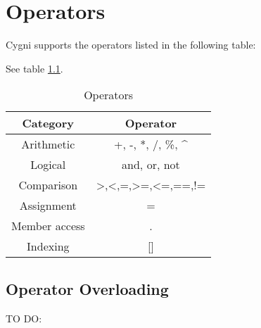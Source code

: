 \chapter{Operators}
Cygni supports the operators listed in the following table:

See table \ref{operators}.
\begin{table}
	\centering
	\begin{tabular}{|c|c|}
		\hline
		Category & Operator \\ 
		\hline
		Arithmetic & +, -, *, /, \%, \^ \\
		\hline
		Logical & and, or, not \\
		\hline
		Comparison & >,<,=,>=,<=,==,!= \\
		\hline
		Assignment & = \\
		\hline
		Member access & . \\
		\hline 
		Indexing & [] \\
		\hline
		\end{tabular}
\label{operators}
\caption{Operators}
\end{table}
\section{Operator Overloading}
TO DO:
